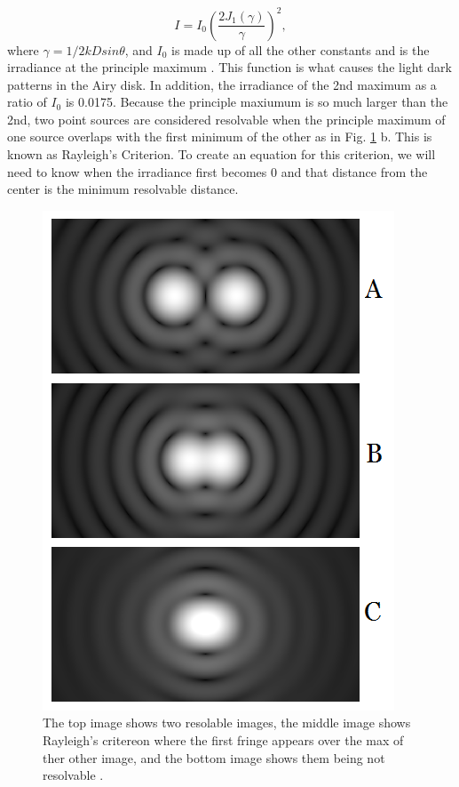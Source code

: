 \documentclass[ notitlepage, numerical, 11pt]{revtex4-1} %
\begin{document}
\begin{equation}
I =  I_0(\frac{2J_1 (\gamma)}{\gamma})^2,
\label{iBessel}
\end{equation} 
where $\gamma = 1/2 k D sin\theta$, and $I_0$ is made up of all the other constants and is the irradiance at the principle maximum \cite{optics}. This function is what causes the light dark patterns in the Airy disk. In addition, the irradiance of the 2nd maximum as a ratio of $I_0$ is 0.0175. Because the principle maxiumum is so much larger than the 2nd, two point sources are considered resolvable when the principle maximum of one source overlaps with the first minimum of the other as in Fig. \ref{criterion} b. This is known as Rayleigh's Criterion. To create an equation for this criterion, we will need to know when the irradiance first becomes 0 and that distance from the center is the minimum resolvable distance. 
\begin{figure}[H]
\centerline{\includegraphics[scale=.45]{criterion.png}}
\caption{The top image shows two resolable images, the middle image shows Rayleigh's critereon where the first fringe appears over the max of ther other image, and the bottom image shows them being not resolvable \cite{rayleigh}.}
\label{criterion}
\end{figure} 
\end{document}
